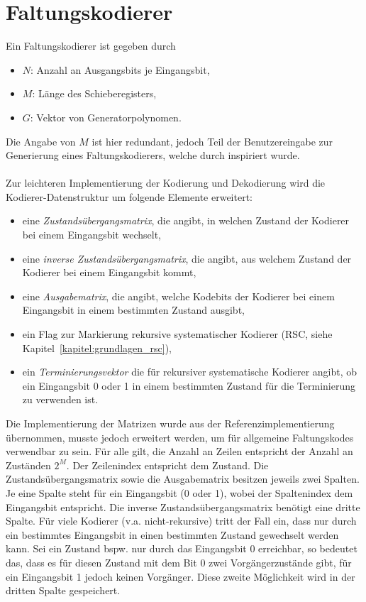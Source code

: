 \section{Faltungskodierer}
\label{kapitel:implementierung_faltungskodierer}
Ein Faltungskodierer ist gegeben durch 
\begin{itemize}
\item $N$: Anzahl an Ausgangsbits je Eingangsbit,
\item $M$: Länge des Schieberegisters,
\item $G$: Vektor von Generatorpolynomen.
\end{itemize}
Die Angabe von $M$ ist hier redundant, jedoch Teil der Benutzereingabe zur Generierung eines Faltungskodierers, welche durch \cite{morelos2006art} inspiriert wurde.
\\
\\
Zur leichteren Implementierung der Kodierung und Dekodierung wird die Kodierer-Datenstruktur um folgende Elemente erweitert:
\begin{itemize}
\item eine \emph{Zustandsübergangsmatrix}, die angibt, in welchen Zustand der Kodierer bei einem Eingangsbit wechselt,
\item eine \emph{inverse Zustandsübergangsmatrix}, die angibt, aus welchem Zustand der Kodierer bei einem Eingangsbit kommt,
\item eine \emph{Ausgabematrix}, die angibt, welche Kodebits der Kodierer bei einem Eingangsbit in einem bestimmten Zustand ausgibt,
\item ein Flag zur Markierung rekursive systematischer Kodierer (RSC, siehe Kapitel~\ref{kapitel:grundlagen_rsc}),
\item ein \emph{Terminierungsvektor} die für rekursiver systematische Kodierer angibt, ob ein Eingangsbit 0 oder 1 in einem bestimmten Zustand für die Terminierung zu verwenden ist.
\end{itemize}
Die Implementierung der Matrizen wurde aus der Referenzimplementierung übernommen, musste jedoch erweitert werden, um für allgemeine Faltungskodes verwendbar zu sein. Für alle gilt, die Anzahl an Zeilen entspricht der Anzahl an Zuständen $2^{M}$. Der Zeilenindex entspricht dem Zustand. Die Zustandsübergangsmatrix sowie die Ausgabematrix besitzen jeweils zwei Spalten. Je eine Spalte steht für ein Eingangsbit (0 oder 1), wobei der Spaltenindex dem Eingangsbit entspricht. Die inverse Zustandsübergangsmatrix benötigt eine dritte Spalte. Für viele Kodierer (v.a. nicht-rekursive) tritt der Fall ein, dass nur durch ein bestimmtes Eingangsbit in einen bestimmten Zustand gewechselt werden kann. Sei ein Zustand bspw. nur durch das Eingangsbit 0 erreichbar, so bedeutet das, dass es für diesen Zustand mit dem Bit 0 zwei Vorgängerzustände gibt, für ein Eingangsbit 1 jedoch keinen Vorgänger. Diese zweite Möglichkeit wird in der dritten Spalte gespeichert.
